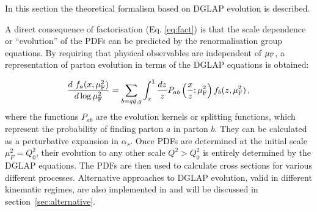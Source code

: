 

%
In this section the theoretical formalism based on DGLAP \cite{Gribov:1972ri,Gribov:1972rt,Lipatov:1974qm,Dokshitzer:1977sg,Altarelli:1977zs} evolution
is described. 

A direct consequence of factorisation (Eq. \ref{eq:fact}) is that the scale dependence or ``evolution'' of the PDFs can be predicted 
by the renormalisation group equations. 
By requiring that physical observables are independent of 
$\mu_\mathrm{F}$, a representation 
of parton evolution in terms of the DGLAP equations is obtained:

\begin{eqnarray}
\frac{d~f_a(x,\mu_\mathrm{F}^2)}{d \log\mu_\mathrm{F}^2} = \sum_{b=q\bar{q},g}\int_{x}^{1}\frac{d z}{z} 
P_{ab}\left(\frac{x}{z};\mu_\mathrm{F}^2\right) f_b(z,\mu_\mathrm{F}^2)\,,
\label{eq:dglap}
\end{eqnarray}
%
where the functions $P_{ab}$ are the evolution kernels or splitting functions, which represent the probability 
of finding parton $a$ in parton $b$. They can be calculated as a  perturbative expansion in $\alpha_s$. 
Once PDFs are determined at the initial
scale $\mu_F^2 = Q_0^2$, their evolution to any other scale $Q^2 > Q_0^2$ is entirely determined by the DGLAP equations.
The PDFs are then used to calculate cross sections for various different processes.
Alternative approaches to DGLAP evolution, valid in different kinematic regimes, 
are also implemented in \fitter and will be discussed in section~\ref{sec:alternative}.


